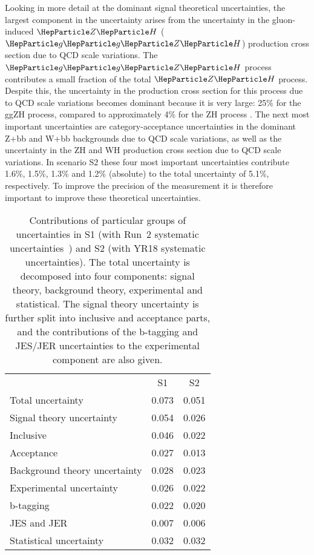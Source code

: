 Looking in more detail at the dominant signal theoretical uncertainties, the largest component in the uncertainty arises from the uncertainty in the gluon-induced $\zh$ ($\ggZH$) production cross section due to QCD scale variations.
The $\ggZH$ process contributes a small fraction of the total $\zh$ process. Despite this, the uncertainty in the production cross section for this process due to QCD scale variations 
becomes dominant because it is very large: 25\% for the ggZH process, compared to approximately 4\% for the ZH process \cite{deFlorian:2016spz}.
The next most important uncertainties are category-acceptance uncertainties in the dominant Z+bb and W+bb backgrounds due to QCD scale variations, as well as the uncertainty in the ZH and WH production
cross section due to QCD scale variations. In scenario S2 these four most important uncertainties contribute 1.6\%, 1.5\%, 1.3\% and 1.2\% (absolute) to
the total uncertainty of 5.1\%, respectively. To improve the precision of the measurement it is therefore important to improve these theoretical uncertainties.

\begin{table}[th!]
\begin{center}
{
\caption{Contributions of particular groups of uncertainties in S1 (with Run~2 systematic uncertainties~\cite{HIG16044}) and S2 (with YR18 systematic uncertainties). The total uncertainty is decomposed into four components: signal theory, background theory, experimental and statistical. The signal theory uncertainty is further split into inclusive and acceptance parts, and the contributions of the b-tagging and JES/JER uncertainties to the experimental component are also given.}
\label{tab:vhbb_uncertbreakdown}
\begin{tabular}{l c c}
 & S1 & S2\\
Total uncertainty   & 0.073  & 0.051 \\
\hline
Signal theory uncertainty& 0.054 & 0.026\\
\quad Inclusive & 0.046 &0.022\\
\quad Acceptance & 0.027 &0.013\\
Background theory uncertainty & 0.028 & 0.023\\
Experimental uncertainty & 0.026 & 0.022 \\
\quad b-tagging & 0.022  & 0.020 \\
\quad JES and JER & 0.007  & 0.006 \\
Statistical uncertainty & 0.032 & 0.032\\
\end{tabular}
} %
\end{center}
\end{table}

